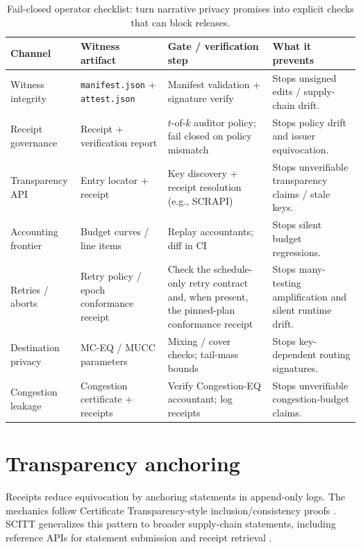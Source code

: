 \documentclass[11pt]{article}
\begin{document}
\begin{table}[t]
\centering
\small
\begin{tabular}{@{}p{2.0cm}p{3.6cm}p{5.0cm}p{3.1cm}@{}}
\toprule
Channel & Witness artifact & Gate / verification step & What it prevents \\
\midrule
Witness integrity & \texttt{manifest.json} + \texttt{attest.json} & Manifest validation + signature verify & Stops unsigned edits / supply-chain drift. \\
Receipt governance & Receipt + verification report & $t$-of-$k$ auditor policy; fail closed on policy mismatch & Stops policy drift and issuer equivocation. \\
Transparency API & Entry locator + receipt & Key discovery + receipt resolution (e.g., SCRAPI) \cite{scitt_scrapi} & Stops unverifiable transparency claims / stale keys. \\
Accounting frontier & Budget curves / line items & Replay accountants; diff in CI & Stops silent budget regressions. \\
Retries / aborts & Retry policy / epoch conformance receipt & Check the schedule-only retry contract and, when present, the pinned-plan conformance receipt \cite{series:schedretries,series:proofcarryingbudgets} & Stops many-testing amplification and silent runtime drift. \\
Destination privacy & MC-EQ / MUCC parameters & Mixing / cover checks; tail-mass bounds & Stops key-dependent routing signatures. \\
Congestion leakage & Congestion certificate + receipts & Verify Congestion-EQ accountant; log receipts \cite{series:wcongeq} & Stops unverifiable congestion-budget claims. \\
\bottomrule
\end{tabular}
\caption{Fail-closed operator checklist: turn narrative privacy promises into explicit checks that can block releases.}
\label{tab:operator-checklist}
\end{table}

\section{Transparency anchoring}
\label{sec:transparency}
Receipts reduce equivocation by anchoring statements in append-only logs.
The mechanics follow Certificate Transparency-style inclusion/consistency proofs \cite{rfc9162}.
SCITT generalizes this pattern to broader supply-chain statements, including reference APIs for statement submission and receipt retrieval \cite{scitt_arch,scitt_scrapi}.
\end{document}

